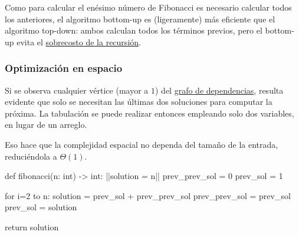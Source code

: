 Como para calcular el enésimo número de Fibonacci es necesario calcular todos los anteriores, el algoritmo bottom-up es (ligeramente) más eficiente que el algoritmo top-down: ambos calculan todos los términos previos, pero el bottom-up evita el \hyperref[sec:sobrecosto_recursion]{sobrecosto de la recursión}.

\subsubsection{Optimización en espacio}
\label{sec:fibonacci_bottom_up_optimizada}

Si se observa cualquier vértice (mayor a \(1\)) del \hyperref[fig:fibonacci_grafo_dependencias]{grafo de dependencias}, resulta evidente que solo se necesitan las últimas dos soluciones para computar la próxima. La tabulación se puede realizar entonces empleando solo dos variables, en lugar de un arreglo. 

Eso hace que la complejidad espacial no dependa del tamaño de la entrada, reduciéndola a $\Theta(1)$.

\begin{codeblock}
\begin{pseudocode}
def fibonacci(n: int) -> int:
    ||solution = n||
    prev_prev_sol = 0
    prev_sol = 1

    for i=2 to n:
        solution = prev_sol + prev_prev_sol
        prev_prev_sol = prev_sol
        prev_sol = solution

    return solution
\end{pseudocode}
\begin{annotations}
\end{annotations}
\end{codeblock}

